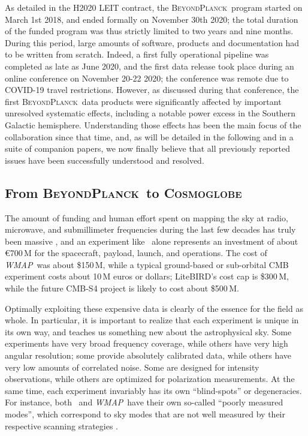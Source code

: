 \documentclass[onecolumn]{aa}
\def\WMAP{\emph{WMAP}}
\newcommand{\BP}{\textsc{BeyondPlanck}}
\begin{document}
As detailed in the H2020 LEIT contract, the \BP\ program started on
March 1st 2018, and ended formally on November 30th 2020; the total
duration of the funded program was thus strictly limited to two years
and nine months. During this period, large amounts of software,
products and documentation had to be written from scratch. Indeed, a
first fully operational pipeline was completed as late as June 2020,
and the first data release took place during an online conference on
November 20-22 2020; the conference was remote due to COVID-19 travel
restrictions. However, as discussed during that conference, the first
\BP\ data products were significantly affected by important unresolved
systematic effects, including a notable power excess in the Southern
Galactic hemisphere. Understanding those effects has been the main
focus of the collaboration since that time, and, as will be detailed
in the following and in a suite of companion papers, we now finally
believe that all previously reported issues have been successfully
understood and resolved.

\subsection{From \BP\ to \textsc{Cosmoglobe}}
\label{sec:cosmoglobe}

The amount of funding and human effort spent on mapping the sky at
radio, microwave, and submillimeter frequencies during the last few
decades has truly been massive \citep{bp05}, and an experiment like
\Planck\ alone represents an investment of about \euro 700\,M for the
spacecraft, payload, launch, and operations. The cost of \WMAP\ was
about \$150\,M, while a typical ground-based or sub-orbital CMB
experiment costs about 10\,M euros or dollars; LiteBIRD's cost cap is
\$300\,M, while the future CMB-S4 project is likely to cost about
\$500\,M.

Optimally exploiting these expensive data is clearly of the essence
for the field as whole. In particular, it is important to realize that
each experiment is unique in its own way, and teaches us something new
about the astrophysical sky. Some experiments have very broad
frequency coverage, while others have very high angular resolution;
some provide absolutely calibrated data, while others have very low
amounts of correlated noise. Some are designed for intensity
observations, while others are optimized for polarization
measurements. At the same time, each experiment invariably has its own
``blind-spots'' or degeneracies. For instance, both \Planck\ and
\WMAP\ have their own so-called ``poorly measured modes'', which
correspond to sky modes that are not well measured by their respective
scanning strategies \citep{planck2016-l01,bennett2012,bp17}.
\end{document}
